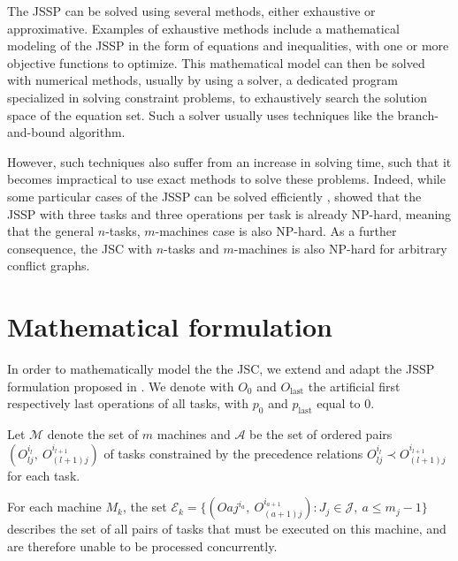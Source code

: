 \documentclass{mimosis}
\begin{document}
The JSSP can be solved using several methods, either exhaustive or approximative. Examples of exhaustive methods include a mathematical modeling of the JSSP in the form of equations and inequalities, with one or more objective functions to optimize. This mathematical model can then be solved with numerical methods, usually by using a solver, a dedicated program specialized in solving constraint problems, to exhaustively search the solution space of the equation set. Such a solver usually uses techniques like the branch-and-bound algorithm.

However, such techniques also suffer from an increase in solving time, such that it becomes impractical to use exact methods to solve these problems. Indeed, while some particular cases of the JSSP can be solved efficiently \citep{blazewicz2007handbook}, \citet{sotskov1995nphardness} showed that the JSSP with three tasks and three operations per task is already NP-hard, meaning that the general \(n\)-tasks, \(m\)-machines case is also NP-hard. As a further consequence, the JSC with \(n\)-tasks and \(m\)-machines is also NP-hard for arbitrary conflict graphs.

\section{Mathematical formulation} \label{sec:mathmodel}
In order to mathematically model the the JSC, we extend and adapt the JSSP formulation proposed in \citet{blazewicz2007handbook}. 
We denote with \(O_0\) and \(O_{\text{last}}\) the artificial first respectively last operations of all tasks, with \(p_0\) and \(p_{\text{last}}\) equal to \(0\).

Let \(\mathcal{M}\) denote the set of \(m\) machines and \(\mathcal{A}\) be the set of ordered pairs \((O_{lj}^{i_l},\ O_{(l+1)j}^{i_{l+1}})\) of tasks constrained by the precedence relations \(O_{lj}^{i_l} \prec O_{(l+1)j}^{i_{l+1}}\) for each task.

For each machine \(M_k\), the set \(\mathcal{E}_k = \{(O{aj}^{i_a},\ O_{(a+1)j}^{i_{a+1}}) : J_j \in \mathcal{J},\ a \leq m_j - 1\}\) describes the set of all pairs of tasks that must be executed on this machine, and are therefore unable to be processed concurrently.
\end{document}
